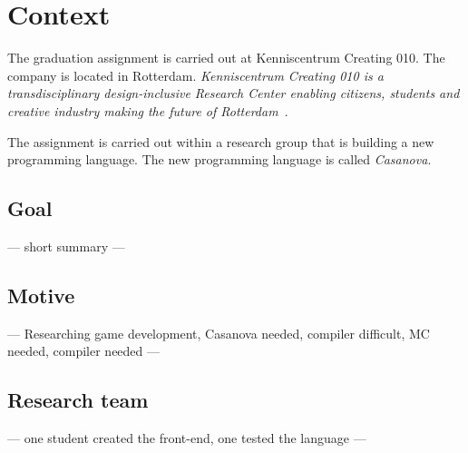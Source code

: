 \section{Context}\label{context}
The graduation assignment is carried out at Kenniscentrum Creating 010.
The company is located in Rotterdam.
\textit{Kenniscentrum Creating 010 is a transdisciplinary design-inclusive Research Center enabling citizens, students and creative industry making the future of Rotterdam}~\cite{creating2016home}.

The assignment is carried out within a research group that is building a new programming language.
The new programming language is called \emph{Casanova}.

\subsection{Goal}
--- short summary ---

\subsection{Motive}\label{motive}
--- Researching game development, Casanova needed, compiler difficult, MC needed, compiler needed ---

\subsection{Research team}
--- one student created the front-end, one tested the language ---

